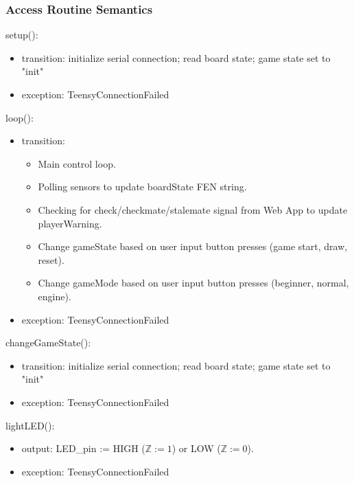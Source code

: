 \documentclass[12pt, titlepage]{article}
\begin{document}
\subsubsection{Access Routine Semantics}

\noindent setup():
\begin{itemize}
\item transition: initialize serial connection; read board state; game state set to "init"
\item exception: TeensyConnectionFailed
\end{itemize}

\noindent loop():
\begin{itemize}
\item transition: \begin{itemize}
  \item Main control loop.
  \item Polling sensors to update boardState FEN string.
  \item Checking for check/checkmate/stalemate signal from Web App to update playerWarning.
  \item Change gameState based on user input button presses (game start, draw, reset).
  \item Change gameMode based on user input button presses (beginner, normal, engine).
\end{itemize}
\item exception: TeensyConnectionFailed
\end{itemize}

\noindent changeGameState():
\begin{itemize}
\item transition: initialize serial connection; read board state; game state set to "init"
\item exception: TeensyConnectionFailed
\end{itemize}

\noindent lightLED():
\begin{itemize}
\item output: LED\_pin := HIGH ($\mathbb{Z} := 1$) or LOW  ($\mathbb{Z} := 0$).
\item exception: TeensyConnectionFailed
\end{itemize}


\end{document}
